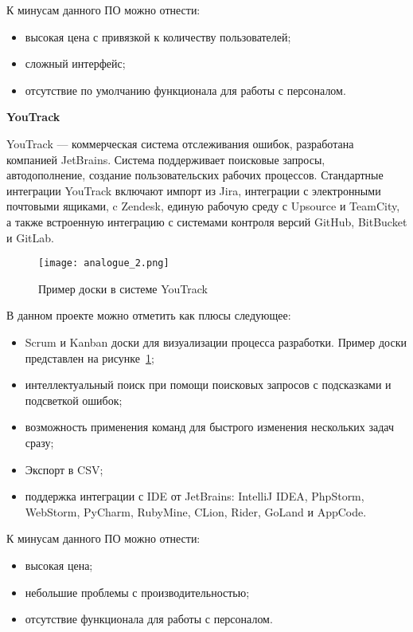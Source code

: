 К минусам данного ПО можно отнести:
\begin{itemize}
    \item высокая цена с привязкой к количеству пользователей;
    \item сложный интерфейс;
    \item отсутствие по умолчанию функционала для работы с персоналом.
\end{itemize}

\bigskip
\textbf{YouTrack}

YouTrack — коммерческая система отслеживания ошибок, разработана компанией JetBrains. Система поддерживает поисковые запросы, автодополнение, создание пользовательских рабочих процессов. Стандартные интеграции YouTrack включают импорт из Jira, интеграции с электронными почтовыми ящиками, c Zendesk, единую рабочую среду с Upsource и TeamCity, а также встроенную интеграцию с системами контроля версий GitHub, BitBucket и GitLab.

\begin{figure}[ht]
    \centering
	\texttt{[image: analogue\_2.png]}
	\caption{Пример доски в системе YouTrack}\label{fig:analysis:analogue_2:picture}
\end{figure}

В данном проекте можно отметить как плюсы следующее:
\begin{itemize}
    \item Scrum и Kanban доски для визуализации процесса разработки. Пример доски представлен на рисунке~\ref{fig:analysis:analogue_2:picture};
    \item интеллектуальный поиск при помощи поисковых запросов с подсказками и подсветкой ошибок;
    \item возможность применения команд для быстрого изменения нескольких задач сразу;
    \item Экспорт в CSV;
    \item поддержка интеграции с IDE от JetBrains: IntelliJ IDEA, PhpStorm, WebStorm, PyCharm, RubyMine, CLion, Rider, GoLand и AppCode.
\end{itemize}

К минусам данного ПО можно отнести:
\begin{itemize}
    \item высокая цена;
    \item небольшие проблемы с производительностью;
    \item отсутствие функционала для работы с персоналом.
\end{itemize}


